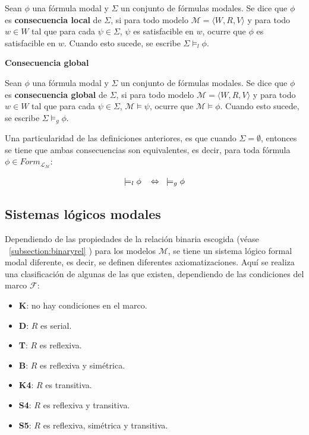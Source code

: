 Sean $\phi$ una fórmula modal y $\Sigma$ un conjunto de fórmulas modales. Se dice que $\phi$ es \textbf{consecuencia local} de $\Sigma$, si para todo modelo $\mathcal{M} = \langle W,R,V \rangle$ y para todo $w \in W$ tal que para cada $\psi \in \Sigma$, $\psi$ es satisfacible en $w$, ocurre que $\phi$ es satisfacible en $w$. Cuando esto sucede, se escribe $\Sigma \models_l \phi$.

\vspace{0.5cm}
\noindent
\textbf{Consecuencia global}

Sean $\phi$ una fórmula modal y $\Sigma$ un conjunto de fórmulas modales. Se dice que $\phi$ es \textbf{consecuencia global} de $\Sigma$, si para todo modelo $\mathcal{M} = \langle W,R,V \rangle$ y para todo $w \in W$ tal que para cada $\psi \in \Sigma$, $\mathcal{M} \models \psi$, ocurre que $\mathcal{M} \models \phi$. Cuando esto sucede, se escribe $\Sigma \models_g \phi$.

\vspace{0.5cm}
Una particularidad de las definiciones anteriores, es que cuando $\Sigma = \emptyset$, entonces se tiene que ambas consecuencias son equivalentes, es decir, para toda fórmula $\phi \in Form_{\mathcal{L}_{\mathcal{M}}}$:

\begin{align*}
    \models_l \phi \hspace{0.3cm} \Leftrightarrow \hspace{0.3cm} \models_g \phi
\end{align*}

\subsection{Sistemas lógicos modales}\label{subsection:lmodalsystems}
Dependiendo de las propiedades de la relación binaria escogida (véase ~\ref{subsection:binaryrel} ) para los modelos $\mathcal{M}$, se tiene un sistema lógico formal modal diferente, es decir, se definen diferentes axiomatizaciones. Aquí se realiza una clasificación de algunas de las que existen, dependiendo de las condiciones del marco $\mathcal{F}$:

\begin{itemize}
    \item \textbf{K}: no hay condiciones en el marco.
    \item \textbf{D}: $R$ es serial.
    \item \textbf{T}: $R$ es reflexiva.
    \item \textbf{B}: $R$ es reflexiva y simétrica.
    \item \textbf{K4}: $R$ es transitiva.
    \item \textbf{S4}: $R$ es reflexiva y transitiva.
    \item \textbf{S5}: $R$ es reflexiva, simétrica y transitiva.
\end{itemize}

